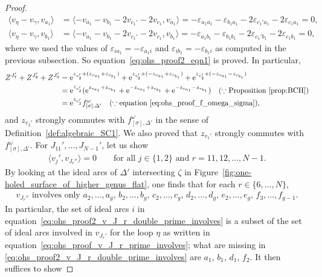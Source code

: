 \documentclass[10pt,a4paper]{amsart}
\numberwithin{equation}{section}
\theoremstyle{definition}
\begin{document}
\begin{proof}
\begin{align*}
\langle v_\eta - v_\gamma,v_{a_1} \rangle & = \langle -v_{a_1} - v_{b_1} -2v_{c_1'} - 2v_{c_1}, v_{a_1}\rangle = - \varepsilon_{a_1 a_1} - \varepsilon_{b_1 a_1} - 2\varepsilon_{c_1' a_1} - 2\varepsilon_{c_1 a_1} =0, \\
\langle v_\eta - v_\gamma,v_{b_1} \rangle & = \langle -v_{a_1} - v_{b_1} -2v_{c_1'} - 2v_{c_1}, v_{b_1}\rangle = - \varepsilon_{a_1 b_1} - \varepsilon_{b_1 b_1} - 2\varepsilon_{c_1' b_1} - 2\varepsilon_{c_1 b_1} = 0,
\end{align*}
where we used the values of $\varepsilon_{i a_1} = - \varepsilon_{a_1 i}$ and $\varepsilon_{i b_1} = - \varepsilon_{b_1 i}$ as computed in the previous subsection. So equation~\eqref{eq:ohs_proof2_eqn1} is proved. In particular,
\begin{align*}
Z^{J_7'} + Z^{J_8'} + Z^{J_9'} & = {\rm e}^{z_{v_2'} + (z_{v_{a_1}} + z_{v_{b_1}})} + {\rm e}^{z_{v_2'} + (- z_{v_{a_1}} + z_{v_{b_1}})} + {\rm e}^{z_{v_2'} + (-z_{v_{a_1}} - z_{v_{b_1}})} \\
& = {\rm e}^{z_{v_2'}}( {\rm e}^{z_{v_{a_1}} + z_{v_{b_1}}} + {\rm e}^{-z_{v_{a_1}} + z_{v_{b_1}}} + {\rm e}^{-z_{v_{a_1}} -z_{v_{b_1}}}) \quad (\because \mbox{Proposition~\ref{prop:BCH}}) \\
& = {\rm e}^{z_{v_2'}} f^\omega_{[\sigma],\Delta'} \quad (\because \mbox{equation~\eqref{eq:ohs_proof_f_omega_sigma}}),
\end{align*}
and $z_{v_2'}$ strongly commutes with $f^\omega_{[\sigma],\Delta'}$ in the sense of Definition~\ref{def:algebraic_SC1}. We also proved that $z_{v_1'}$ strongly commutes with $f^\omega_{[\sigma],\Delta'}$.
For $J_{11}',\dots,J_{N-1}'$, let us show
\begin{align}
\label{eq:ohs_proof2_eqn2}
\langle v_j', v_{J_r''}\rangle=0 \qquad \mbox{for all $j\in \{1,2\}$ and $r=11,12,\dots,N-1$}.
\end{align}
By looking at the ideal arcs of $\Delta'$ intersecting $\zeta$ in Figure~\ref{fig:one-holed_surface_of_higher_genus_flat}, one finds that for each $r\in\{6,\dots,N\}$,
\begin{align}
\label{eq:ohs_proof2_v_J_r_double_prime_involves}
\mbox{$v_{J_r''}$ involves only $a_2,\dots,a_g$, $b_2,\dots,b_g$, $c_2,\dots,c_g$, $d_2,\dots,d_g$, $e_2,\dots,e_g$, $f_3,\dots,f_{g-1}$.}\!\!\!
\end{align}
In particular, the set of ideal arcs $i$ in equation~\eqref{eq:ohs_proof2_v_J_r_double_prime_involves} is a subset of the set of ideal arcs involved in $v_{J_r'}$ for the loop $\eta$ as written in equation~\eqref{eq:ohs_proof_v_J_r_prime_involves}; what are missing in \eqref{eq:ohs_proof2_v_J_r_double_prime_involves} are $a_1$, $b_1$, $d_1$, $f_2$. It then suffices to show

\end{proof}
\end{document}
